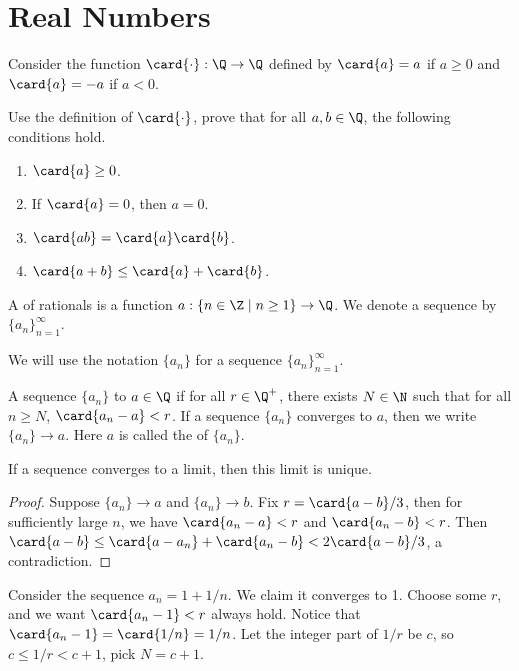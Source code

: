 \documentclass[10pt]{article}
\begin{document}
\section{Real Numbers}
Consider the function $\card{\cdot}:\Q\to\Q$ defined by $\card{a}=a$ if $a\ge 0$ and $\card{a}=-a$ if $a<0$.
\begin{problem}
    Use the definition of $\card{\cdot}$, prove that for all $a,b\in\Q$, the following conditions hold.
    \begin{enumerate}
        \item $\card{a}\ge 0$.
        \item If $\card{a}=0$, then $a=0$.
        \item $\card{ab}=\card{a}\card{b}$.
        \item $\card{a+b}\le\card{a}+\card{b}$.
    \end{enumerate}
\end{problem}
\begin{definition}
    A  of rationals is a function $a:\{n\in\Z\mid n\ge 1\}\to\Q$. We denote a sequence by ${\{{a}_{n}\}}_{n=1}^{\infty}$.
\end{definition}
\begin{remark}
    We will use the notation $\{{a}_{n}\}$ for a sequence ${\{{a}_{n}\}}_{n=1}^{\infty}$.
\end{remark}
\begin{definition}
    A sequence $\{{a}_{n}\}$  to $a\in\Q$ if for all $r\in{\Q}^{+}$, there exists $N\in\N$ such that for all $n\ge N$, $\card{{a}_{n}-a}<r$. If a sequence $\{{a}_{n}\}$ converges to $a$, then we write $\{{a}_{n}\}\to a$. Here $a$ is called the  of $\{{a}_{n}\}$.
\end{definition}
\begin{proposition}
    If a sequence converges to a limit, then this limit is unique.
\end{proposition}
\begin{proof}
    Suppose $\{{a}_{n}\}\to a$ and $\{{a}_{n}\}\to b$. Fix $r=\card{a-b}/3$, then for sufficiently large $n$, we have $\card{{a}_{n}-a}<r$ and $\card{{a}_{n}-b}<r$. Then $\card{a-b}\le\card{a-{a}_{n}}+\card{{a}_{n}-b}<2\card{a-b}/3$, a contradiction.
\end{proof}
\begin{example}
    Consider the sequence ${a}_{n}=1+1/n$. We claim it converges to 1. Choose some $r$, and we want $\card{{a}_{n}-1}<r$ always hold. Notice that $\card{{a}_{n}-1}=\card{1/n}=1/n$. Let the integer part of $1/r$ be $c$, so $c\le 1/r<c+1$, pick $N=c+1$.
\end{example}
\end{document}
